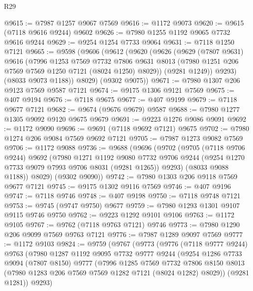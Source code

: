 \begin{lexlean}{R29}
\begin{coremodule}
@9615 := @7987 @1257 @9067 @7569
@9616 := @1172 @9073
@9620 := @9615 (@7118 @9616 @9244) @9602
@9626 := @7980 @1255 @1192 @9065 @7732 @9616 @9244
@9629 := @9254 @1254 @7733 @9064
@9631 := @7118 @1250 @7121
@9665 := @9598
    (@9606
      (@9612
        (@9620
          (@9626
            (@9629
              (@7807 @9631)
              @9616
              (@7996
                @1253
                @7569
                @7732
                @7806
                @9631
                @8013
                (@7980 @1251 @206 @7569 @7569 @1250 @7121 (@8024 @1250) @8029))
              (@9281 @1249))
            @9293)
          (@8033 @9073 @1188))
        @8029)
      (@9302 @9075))
@9671 := @7980 @1307 @206 @9123 @7569 @9587 @7121
@9674 := @9175 @1306 @9121 @7569
@9675 := @407 @9194
@9676 := @7118 @9675
@9677 := @407 @9199
@9679 := @7118 @9677 @7121
@9682 := @9674 (@9676 @9679) @9587
@9688 := @7980 @1277 @1305 @9092 @9120 @9675 @9679
@9691 := @9223 @1276 @9086 @9091
@9692 := @1172 @9090
@9696 := @9691 (@7118 @9692 @7121) @9675
@9702 := @7980 @1274 @206 @9084 @7569 @9692 @7121
@9705 := @7987 @1273 @9082 @7569
@9706 := @1172 @9088
@9736 := @9688
    (@9696
      (@9702
        (@9705
          (@7118 @9706 @9244)
          @9692
          (@7980
            @1271
            @1192
            @9080
            @7732
            @9706
            @9244
            (@9254 @1270 @7733 @9079 @7993 @9706 @8031 (@9281 @1265))
            @9293)
          (@8033 @9088 @1188))
        @8029)
      (@9302 @9090))
@9742 := @7980 @1303 @206 @9118 @7569 @9677 @7121
@9745 := @9175 @1302 @9116 @7569
@9746 := @407 @9196
@9747 := @7118 @9746
@9748 := @407 @9198
@9750 := @7118 @9748 @7121
@9753 := @9745 (@9747 @9750) @9677
@9759 := @7980 @1293 @1301 @9107 @9115 @9746 @9750
@9762 := @9223 @1292 @9101 @9106
@9763 := @1172 @9105
@9767 := @9762 (@7118 @9763 @7121) @9746
@9773 := @7980 @1290 @206 @9099 @7569 @9763 @7121
@9776 := @7987 @1289 @9097 @7569
@9777 := @1172 @9103
@9824 := @9759
    (@9767
      (@9773
        (@9776
          (@7118 @9777 @9244)
          @9763
          (@7980
            @1287
            @1192
            @9095
            @7732
            @9777
            @9244
            (@9254
              @1286
              @7733
              @9094
              (@7807 @8150)
              @9777
              (@7996
                @1285
                @7569
                @7732
                @7806
                @8150
                @8013
                (@7980 @1283 @206 @7569 @7569 @1282 @7121 (@8024 @1282) @8029))
              (@9281 @1281))
            @9293)

\end{coremodule}
\end{lexlean}
